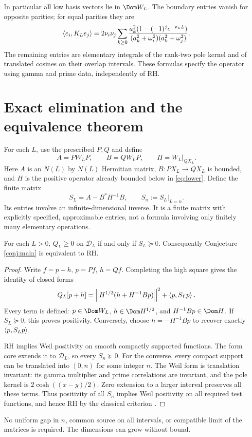 In particular all low basis vectors lie in $\Dom W_L$. The boundary entries
vanish for opposite parities; for equal parities they are
\begin{equation}\label{eq:entries}
\left\langle e_i,K_Le_j\right\rangle=2\nu_i\nu_j\sum_{k\ge0}
\frac{a_k^2(1-(-1)^j e^{-a_kL})}
{(a_k^2+\omega_i^2)(a_k^2+\omega_j^2)}.
\end{equation}
The remaining entries are elementary integrals of the rank-two pole
kernel and of translated cosines on their overlap intervals. These formulas
specify the operator using gamma and prime data, independently of RH.

\section{Exact elimination and the equivalence theorem}
For each $L$, use the prescribed $P,Q$ and define
\[
A=PW_LP,\qquad B=QW_LP,\qquad H=W_L|_{QX_L}.
\]
Here $A$ is an $N(L)$ by $N(L)$ Hermitian matrix, $B:PX_L\to QX_L$ is
bounded, and $H$ is the positive operator already bounded below in
\eqref{eq:lower}. Define the finite matrix
\begin{equation}\label{eq:schur}
S_L=A-B^*H^{-1}B,\qquad S_n:=S_L\big|_{L=n}.
\end{equation}
Its entries involve an infinite-dimensional inverse. It is a finite matrix
with explicitly specified, approximable entries, not a formula involving
only finitely many elementary operations.

\begin{theorem}\label{thm:equiv}
For each $L>0$, $Q_L\ge0$ on $\mathcal D_L$ if and only if $S_L\succeq0$.
Consequently Conjecture \ref{conj:main} is equivalent to RH.
\end{theorem}
\begin{proof}
Write $f=p+h$, $p=Pf$, $h=Qf$. Completing the high square gives the
identity of closed forms
\begin{equation}\label{eq:square}
Q_L[p+h]=\left\lVert H^{1/2}(h+H^{-1}Bp)\right\rVert^2+\left\langle p,S_Lp\right\rangle.
\end{equation}
Every term is defined: $p\in\Dom W_L$, $h\in\Dom H^{1/2}$, and
$H^{-1}Bp\in\Dom H$. If $S_L\succeq0$, this proves positivity. Conversely,
choose $h=-H^{-1}Bp$ to recover exactly $\left\langle p,S_Lp\right\rangle$.

RH implies Weil positivity on smooth compactly supported functions.
The form core extends it to $\mathcal D_L$, so every $S_n\succeq0$.
For the converse, every compact support can be translated into $(0,n)$
for some integer $n$. The Weil form is translation invariant: its gamma
multiplier and prime correlations are invariant, and the pole kernel is
$2\cosh((x-y)/2)$. Zero extension to a larger interval preserves all these
terms. Thus positivity of all $S_n$ implies Weil positivity on all required
test functions, and hence RH by the classical criterion \cite{Suzuki}.
\end{proof}
No uniform gap in $n$, common source on all intervals, or compatible limit
of the matrices is required. The dimensions can grow without bound.

